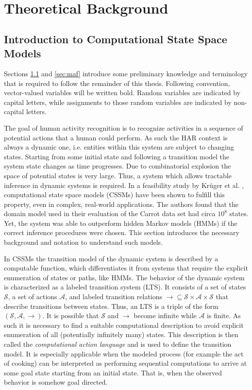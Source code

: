 \documentclass[11pt,titlepage,oneside,openany]{book}
\begin{document}
\chapter{Theoretical Background}
\label{cha:theory}

\section{Introduction to Computational State Space Models}
\label{sec:cssm}
Sections \ref{sec:cssm} and \ref{sec:maf} introduce some preliminary knowledge and terminology that is required to follow the remainder  of this thesis. Following convention, vector-valued variables will be written bold. Random variables are indicated by capital letters, while assignments to those random variables are indicated by non-capital letters.

The goal of human activity recognition is to recognize activities in a sequence of potential actions that a human could perform. As such the HAR context is always a dynamic one, i.e. entities within this system are subject to changing states. Starting from some initial state and following a transition model the system state changes as time progresses. Due to combinatorial explosion the space of potential states is very large. Thus, a system which allows tractable inference in dynamic systems is required. In a feasibility study by Kr\"uger et al.  \cite{kruger_computational_2014}, computational state space models (CSSMs) have been shown to fulfill this property, even in complex, real-world applications. The authors found that the domain model used in their evaluation of the Carrot data set had circa $10^8$ states. Yet, the system was able to outperform hidden Markov models (HMMs) if the correct inference procedures were chosen. This section introduces the necessary background and notation to understand such models.

In CSSMs the transition model of the dynamic system is described by a computable function, which differentiates it from systems that require the explicit enumeration of states or paths, like HMMs. The behavior of the dynamic system is characterized as a labeled transition system (LTS). It consists of a set of states $\mathcal{S}$, a set of actions $\mathcal{A}$, and labeled transition relations $\rightarrow \subseteq \mathcal{S} \times \mathcal{A} \times \mathcal{S}$ that describe transitions between states. Thus, an LTS is a triple of the form $(\mathcal{S}, \mathcal{A}, \rightarrow)$. It is possible that $\mathcal{S}$ and $\rightarrow$ become infinite while $\mathcal{A}$ is finite. As such it is necessary to find a suitable computational description to avoid explicit enumeration of all (potentially infinitely many) states. This description is then called the \emph{computational action language} and is used to define the transition model. It is especially applicable when the modeled process (for example the act of cooking) can be interpreted as performing sequential computations to arrive at some goal state starting from an initial state. That is, when the observed behavior is somehow goal directed.
\end{document}
